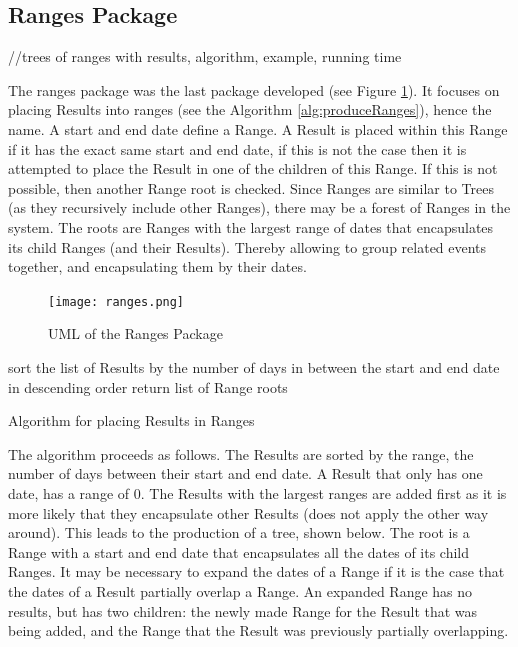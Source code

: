 \subsection{Ranges Package}
//trees of ranges with results, algorithm, example, running time
\par The ranges package was the last package developed (see Figure \ref{fig:ranges}). It focuses on placing Results into ranges (see the Algorithm \ref{alg:produceRanges}), hence the name. A start and end date define a Range. A Result is placed within this Range if it has the exact same start and end date, if this is not the case then it is attempted to place the Result in one of the children of this Range. If this is not possible, then another Range root is checked. Since Ranges are similar to Trees (as they recursively include other Ranges), there may be a forest of Ranges in the system. The roots are Ranges with the largest range of dates that encapsulates its child Ranges (and their Results). Thereby allowing to group related events together, and encapsulating them by their dates.  
\begin{figure}[H]
\caption{UML of the Ranges Package}
\label{fig:ranges}
\texttt{[image: ranges.png]}
\centering
\end{figure}
\begin{algorithm}
sort the list of Results by the number of days in between the start and end date in descending order\;
return list of Range roots\;
\caption{Algorithm for placing Results in Ranges}
\label{alg:produceRanges}
\end{algorithm}
\par The algorithm proceeds as follows. The Results are sorted by the range, the number of days between their start and end date. A Result that only has one date, has a range of 0. The Results with the largest ranges are added first as it is more likely that they encapsulate other Results (does not apply the other way around). This leads to the production of a tree, shown below. The root is a Range with a start and end date that encapsulates all the dates of its child Ranges. It may be necessary to expand the dates of a Range if it is the case that the dates of a Result partially overlap a Range. An expanded Range has no results, but has two children: the newly made Range for the Result that was being added, and the Range that the Result was previously partially overlapping.

